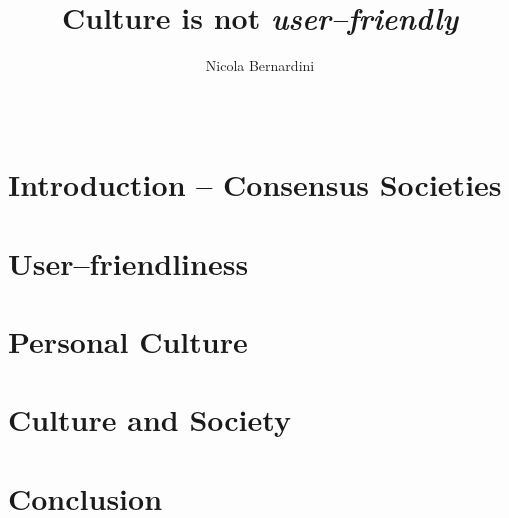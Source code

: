 \documentclass{scrartcl}
\title{Culture is not \emph{user--friendly}}
\author{Nicola Bernardini}
\date{~}
\begin{document}
\maketitle

\section{Introduction -- Consensus Societies}


\section{User--friendliness}

\section{Personal Culture}

\section{Culture and Society}

\section{Conclusion}
\end{document}
